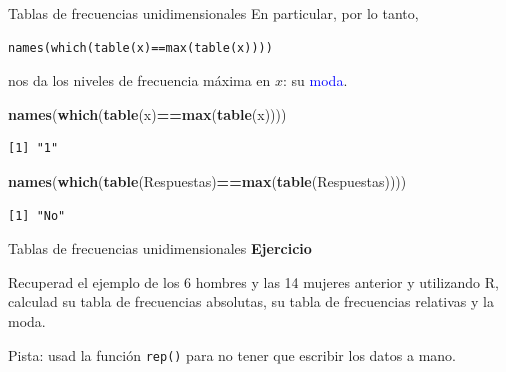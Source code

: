 \documentclass[
  ignorenonframetext,
  aspectratio=169]{beamer}
\newenvironment{Shaded}{\begin{snugshade}}{\end{snugshade}}
\newcommand{\FunctionTok}[1]{\textcolor[rgb]{0.13,0.29,0.53}{\textbf{#1}}}
\newcommand{\NormalTok}[1]{#1}
\newcommand{\SpecialCharTok}[1]{\textcolor[rgb]{0.81,0.36,0.00}{\textbf{#1}}}
\newcommand\blue[1]{\textcolor{blue}{#1}}
\begin{document}
\begin{frame}[fragile]{Tablas de frecuencias unidimensionales}
\label{tablas-de-frecuencias-unidimensionales-13}
En particular, por lo tanto,

\begin{verbatim}
names(which(table(x)==max(table(x))))
\end{verbatim}

nos da los niveles de frecuencia máxima en \(x\): su \blue{moda}.

\begin{Shaded}
\begin{Highlighting}[]
\FunctionTok{names}\NormalTok{(}\FunctionTok{which}\NormalTok{(}\FunctionTok{table}\NormalTok{(x)}\SpecialCharTok{==}\FunctionTok{max}\NormalTok{(}\FunctionTok{table}\NormalTok{(x))))}
\end{Highlighting}
\end{Shaded}

\begin{verbatim}
[1] "1"
\end{verbatim}

\begin{Shaded}
\begin{Highlighting}[]
\FunctionTok{names}\NormalTok{(}\FunctionTok{which}\NormalTok{(}\FunctionTok{table}\NormalTok{(Respuestas)}\SpecialCharTok{==}\FunctionTok{max}\NormalTok{(}\FunctionTok{table}\NormalTok{(Respuestas))))}
\end{Highlighting}
\end{Shaded}

\begin{verbatim}
[1] "No"
\end{verbatim}
\end{frame}

\begin{frame}[fragile]{Tablas de frecuencias unidimensionales}
\label{tablas-de-frecuencias-unidimensionales-14}
\textbf{Ejercicio}

Recuperad el ejemplo de los 6 hombres y las 14 mujeres anterior y
utilizando R, calculad su tabla de frecuencias absolutas, su tabla de
frecuencias relativas y la moda.

Pista: usad la función \texttt{rep()} para no tener que escribir los
datos a mano.
\end{frame}
\end{document}
